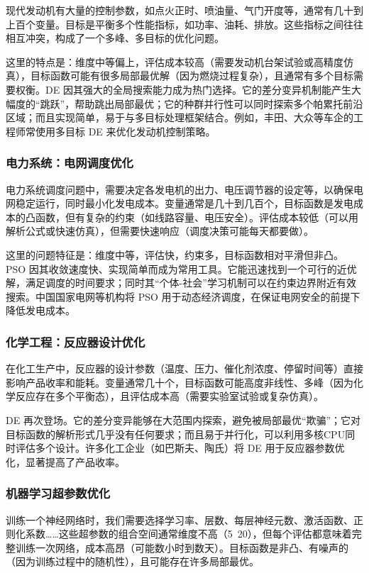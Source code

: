 \documentclass[lang=cn,zihao=-4,a4paper,fontset=windows]{beautybook}
\begin{document}
现代发动机有大量的控制参数，如点火正时、喷油量、气门开度等，通常有几十到上百个变量。目标是平衡多个性能指标，如功率、油耗、排放。这些指标之间往往相互冲突，构成了一个多峰、多目标的优化问题。

这里的特点是：维度中等偏上，评估成本较高（需要发动机台架试验或高精度仿真），目标函数可能有很多局部最优解（因为燃烧过程复杂），且通常有多个目标需要权衡。DE 因其强大的全局搜索能力成为热门选择。它的差分变异机制能产生大幅度的“跳跃”，帮助跳出局部最优；它的种群并行性可以同时探索多个帕累托前沿区域；而且实现简单，易于与多目标处理框架结合。例如，丰田、大众等车企的工程师常使用多目标 DE 来优化发动机控制策略。

\subsubsection{电力系统：电网调度优化}

电力系统调度问题中，需要决定各发电机的出力、电压调节器的设定等，以确保电网稳定运行，同时最小化发电成本。变量通常是几十到几百个，目标函数是发电成本的凸函数，但有复杂的约束（如线路容量、电压安全）。评估成本较低（可以用解析公式或快速仿真），但需要快速响应（调度决策可能每天都要做）。

这里的问题特征是：维度中等，评估快，约束多，目标函数相对平滑但非凸。PSO 因其收敛速度快、实现简单而成为常用工具。它能迅速找到一个可行的近优解，满足调度的时间要求；同时其“个体-社会”学习机制可以在约束边界附近有效搜索。中国国家电网等机构将 PSO 用于动态经济调度，在保证电网安全的前提下降低发电成本。

\subsubsection{化学工程：反应器设计优化}

在化工生产中，反应器的设计参数（温度、压力、催化剂浓度、停留时间等）直接影响产品收率和能耗。变量通常几十个，目标函数可能高度非线性、多峰（因为化学反应存在多个平衡态），且评估成本高（需要实验室试验或复杂仿真）。

DE 再次登场。它的差分变异能够在大范围内探索，避免被局部最优“欺骗”；它对目标函数的解析形式几乎没有任何要求；而且易于并行化，可以利用多核CPU同时评估多个设计。许多化工企业（如巴斯夫、陶氏）将 DE 用于反应器参数优化，显著提高了产品收率。

\subsubsection{机器学习超参数优化}

训练一个神经网络时，我们需要选择学习率、层数、每层神经元数、激活函数、正则化系数……这些超参数的组合空间通常维度不高（5~20），但每个评估都意味着完整训练一次网络，成本高昂（可能数小时到数天）。目标函数是非凸、有噪声的（因为训练过程中的随机性），且可能存在许多局部最优。
\end{document}
